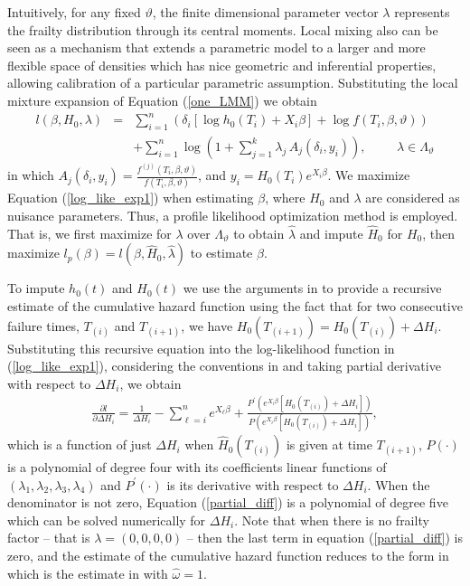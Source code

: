 \documentclass[graybox]{svmult}
\begin{document}
Intuitively, for any fixed $\vartheta$, the finite dimensional parameter vector $\lambda$ represents
the frailty distribution through its central moments. Local mixing also can be seen as a mechanism that
extends a parametric model to a larger and more flexible space of densities which has nice geometric
and inferential properties,  allowing calibration of a particular parametric assumption.
\noindent
Substituting the local mixture expansion  of Equation (\ref{one_LMM}) we obtain
\begin{eqnarray}
l(\beta,H_0, \lambda)&=&\sum\nolimits_{i=1}^{n}{\left(\delta_i[\log h_0(T_i)+ X_i \beta]+ \log f(T_i,\beta,\vartheta)\right)}\nonumber\\ 
 &&+  \sum\nolimits_{i=1}^{n}\log \left( 1+\sum\nolimits_{j=1}^{k}{\lambda_j\, A_{j}(\delta_i,y_i)} \right), \hspace{1cm} \lambda\in \Lambda_{\vartheta}\label{log_like_exp1}
\end{eqnarray}
in which $A_{j}(\delta_i,y_i)= \frac{f^{(j)}(T_i,\beta,\vartheta)}{f(T_i,\beta,\vartheta)}$,
and $y_i=H_0(T_i) e^{X_i \beta}$. We maximize Equation (\ref{log_like_exp1}) when 
estimating $\beta$, where $H_0$ and $\lambda$ are considered as nuisance parameters. Thus, a profile likelihood optimization method is
employed. That is, we first maximize for $\lambda$ over $\Lambda_{\vartheta}$ to obtain $\hat{\lambda}$ 
and impute $\hat{H}_0$ for $H_0$, then maximize $l_p(\beta)=l(\beta,\hat{H}_0,\hat{\lambda})$ to estimate $\beta$.

To impute $h_0(t)$ and $H_0(t)$ we  use the arguments in \cite{Gorfine2006}
to provide a recursive estimate of the cumulative hazard function using the fact that for two consecutive failure times,
$T_{(i)}$ and  $T_{(i+1)}$, we have $H_0(T_{(i+1)})=H_0(T_{(i)})+\Delta H_i$. Substituting this recursive
equation into the log-likelihood function in (\ref{log_like_exp1}), considering the conventions in \cite{Breslow1972} and
taking partial derivative with respect to $\Delta H_i$, we obtain 
\begin{eqnarray}
\frac{\partial l}{\partial \Delta H_i}=\frac{1}{\Delta H_i}-\sum_{\ell=i}^{n}e^{X_\ell \beta}+\frac{P^{\prime}(e^{X_i\beta}[H_0(T_{(i)})+\Delta H_i])}
{P(e^{X_i\beta}[H_0(T_{(i)})+\Delta H_i])},\label{partial_diff} 
\end{eqnarray}
which is a function of just $\Delta H_i$ when $\hat{H}_0(T_{(i)})$ is given at time $T_{(i+1)}$, $P(\cdot)$
is a polynomial of degree four with its coefficients  linear functions of $(\lambda_1,\lambda_2,\lambda_3,\lambda_4)$ and $P^{\prime}(\cdot)$
is its derivative with respect to $\Delta H_i$.
When the denominator is not zero, Equation (\ref{partial_diff}) is a polynomial of degree five which can be solved numerically
for $\Delta H_i$. Note that when there is no frailty factor --  that is $\lambda=(0,0,0,0)$ --  then the last term in equation
(\ref{partial_diff}) is zero, and the estimate of the cumulative hazard function reduces to the form in \cite{Johansen1983}
which is the estimate in \cite{Klein1992} with $\hat{\omega}=1$.
\end{document}
